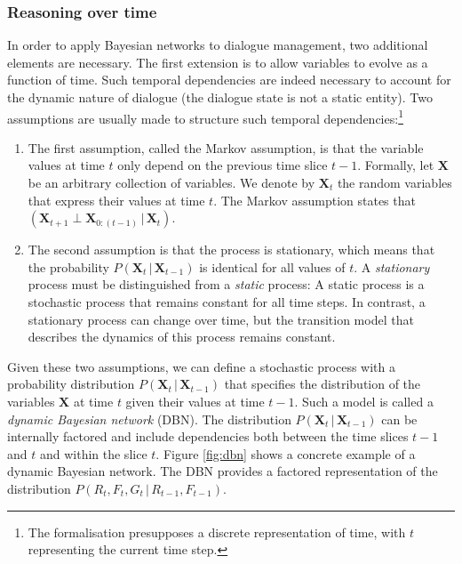 \subsubsection*{Reasoning over time}

In order to apply Bayesian networks to dialogue management, two additional elements are necessary. The first extension is to allow variables to evolve as a function of time.  Such temporal dependencies are indeed necessary to account for the dynamic nature of dialogue (the dialogue state is not a static entity). Two assumptions are usually made to structure such temporal dependencies:\footnote{The formalisation presupposes a discrete representation of time, with $t$ representing the current time step.} \begin{enumerate}
\item The first assumption, called the Markov assumption, is that the variable values at time $t$ only depend on the previous time slice $t\!-\!1$.  Formally, let $\mathbf{X}$ be an arbitrary collection of variables. We denote by $\mathbf{X}_t$ the random variables that express their values at time $t$.  The Markov assumption states that $(\mathbf{X}_{t+1} \; \bot \; \mathbf{X}_{0:(t-1)}  \, | \,  \mathbf{X}_{t})$.  

\item The second assumption is that the process is stationary, which means that the probability $P(\mathbf{X}_t  \, | \,  \mathbf{X}_{t\!-\!1})$ is identical for all values of $t$. A \textit{stationary} process must be distinguished from a \textit{static} process: A static process is a stochastic process that remains constant for all time steps. In contrast, a stationary process can change over time, but the transition model that describes the dynamics of this process remains constant.
\end{enumerate}

Given these two assumptions, we can define a stochastic process with a probability distribution $P(\mathbf{X}_t  \, | \,  \mathbf{X}_{t\!-\!1})$ that specifies the distribution of the variables $\mathbf{X}$ at time $t$ given their values at time $t\!-\!1$. Such a model is called a \textit{dynamic Bayesian network} (DBN). The distribution $P(\mathbf{X}_t  \, | \,  \mathbf{X}_{t\!-\!1})$ can be internally factored and include dependencies both between the time slices $t\!-\!1$ and $t$ and within the slice $t$.  Figure \ref{fig:dbn} shows a concrete example of a dynamic Bayesian network. The DBN provides a factored representation of the distribution  $P(R_t, F_t, G_t \, | \, R_{t\!-\!1}, F_{t\!-\!1})$.  

